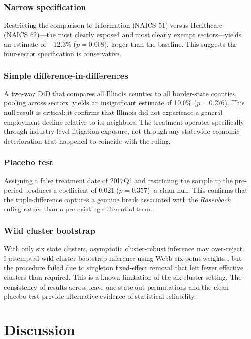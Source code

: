 \documentclass[12pt]{article}
\begin{document}
\subsubsection*{Narrow specification} Restricting the comparison to Information (NAICS 51) versus Healthcare (NAICS 62)---the most clearly exposed and most clearly exempt sectors---yields an estimate of $-$12.3\% ($p = 0.008$), larger than the baseline. This suggests the four-sector specification is conservative.

\subsubsection*{Simple difference-in-differences} A two-way DiD that compares all Illinois counties to all border-state counties, pooling across sectors, yields an insignificant estimate of 10.0\% ($p = 0.276$). This null result is critical: it confirms that Illinois did not experience a general employment decline relative to its neighbors. The treatment operates specifically through industry-level litigation exposure, not through any statewide economic deterioration that happened to coincide with the ruling.

\subsubsection*{Placebo test} Assigning a false treatment date of 2017Q1 and restricting the sample to the pre-period produces a coefficient of 0.021 ($p = 0.357$), a clean null. This confirms that the triple-difference captures a genuine break associated with the \emph{Rosenbach} ruling rather than a pre-existing differential trend.

\subsubsection*{Wild cluster bootstrap} With only six state clusters, asymptotic cluster-robust inference may over-reject. I attempted wild cluster bootstrap inference using Webb six-point weights \citep{webb2023}, but the procedure failed due to singleton fixed-effect removal that left fewer effective clusters than required. This is a known limitation of the six-cluster setting. The consistency of results across leave-one-state-out permutations and the clean placebo test provide alternative evidence of statistical reliability.




\section{Discussion}
\label{sec:discussion}
\end{document}
